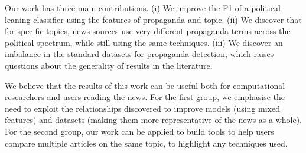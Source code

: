 Our work has three main contributions.
(i) We improve the F1 of a political leaning classifier using the features of propaganda and topic.
(ii)
We discover that for specific topics, news sources use very different propaganda terms across the political spectrum, while still using the same techniques.
(iii) We discover an imbalance in the standard datasets for propaganda detection, which raises questions about the generality of results in the literature.


We believe that the results of this work can be useful both for computational researchers and users reading the news.
For the first group, we emphasise the need to exploit the relationships discovered to improve models (using mixed features) and datasets (making them more representative of the news as a whole).
For the second group, our work can be applied to build tools to help users compare multiple articles on the same topic, to highlight any techniques used.
